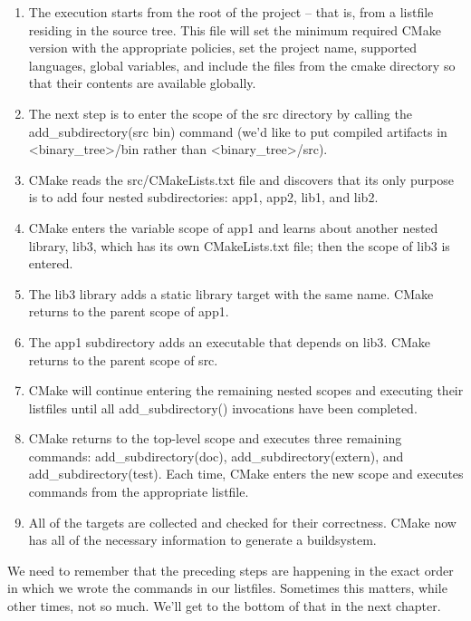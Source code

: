 \begin{enumerate}
\item 
The execution starts from the root of the project – that is, from a listfile residing in the source tree. This file will set the minimum required CMake version with the appropriate policies, set the project name, supported languages, global variables, and include the files from the cmake directory so that their contents are available globally.

\item 
The next step is to enter the scope of the src directory by calling the add\_subdirectory(src bin) command (we'd like to put compiled artifacts in <binary\_tree>/bin rather than <binary\_tree>/src).

\item 
CMake reads the src/CMakeLists.txt file and discovers that its only purpose is to add four nested subdirectories: app1, app2, lib1, and lib2.

\item 
CMake enters the variable scope of app1 and learns about another nested library, lib3, which has its own CMakeLists.txt file; then the scope of lib3 is entered.

\item 
The lib3 library adds a static library target with the same name. CMake returns to the parent scope of app1.

\item 
The app1 subdirectory adds an executable that depends on lib3. CMake returns to the parent scope of src.

\item 
CMake will continue entering the remaining nested scopes and executing their listfiles until all add\_subdirectory() invocations have been completed.

\item 
CMake returns to the top-level scope and executes three remaining commands: add\_subdirectory(doc), add\_subdirectory(extern), and add\_subdirectory(test). Each time, CMake enters the new scope and executes commands from the appropriate listfile.

\item 
All of the targets are collected and checked for their correctness. CMake now has all of the necessary information to generate a buildsystem.
\end{enumerate}

We need to remember that the preceding steps are happening in the exact order in which we wrote the commands in our listfiles. Sometimes this matters, while other times, not so much. We'll get to the bottom of that in the next chapter.

